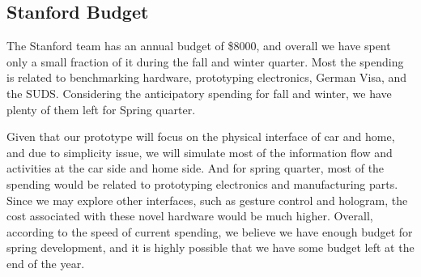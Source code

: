 \subsection{Stanford Budget}

The Stanford team has an annual budget of \$8000, and overall we have spent only a small fraction of it during the fall and winter quarter. Most the spending is related to benchmarking hardware, prototyping electronics, German Visa, and the SUDS. Considering the anticipatory spending for fall and winter, we have plenty of them left for Spring quarter. 

Given that our prototype will focus on the physical interface of car and home, and due to simplicity issue, we will simulate most of the information flow and activities at the car side and home side. And for spring quarter, most of the spending would be related to prototyping electronics and manufacturing parts. Since we may explore other interfaces, such as gesture control and hologram, the cost associated with these novel hardware would be much higher. Overall, according to the speed of current spending, we believe we have enough budget for spring development, and it is highly possible that we have some budget left at the end of the year.   


